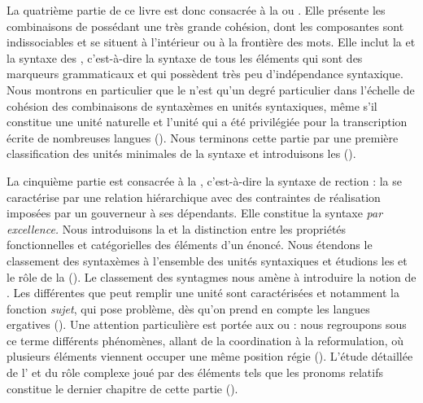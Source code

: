 La quatrième partie de ce livre est donc consacrée à la  ou . Elle présente les combinaisons de  possédant une très grande cohésion, dont les composantes sont indissociables et se situent à l’intérieur ou à la frontière des mots. Elle inclut la  et la syntaxe des , c’est-à-dire la syntaxe de tous les éléments qui sont des marqueurs grammaticaux et qui possèdent très peu d’indépendance syntaxique. Nous montrons en particulier que le  n’est qu’un degré particulier dans l’échelle de cohésion des combinaisons de syntaxèmes en unités syntaxiques, même s’il constitue une unité naturelle et l’unité qui a été privilégiée pour la transcription écrite de nombreuses langues (). Nous terminons cette partie par une première classification des unités minimales de la syntaxe et introduisons les   ().

La cinquième partie est consacrée à la , c’est-à-dire la syntaxe de rection : la  se caractérise par une relation hiérarchique avec des contraintes de réalisation imposées par un gouverneur à ses dépendants. Elle constitue la syntaxe \textit{par excellence.} Nous introduisons la  et la distinction entre les propriétés fonctionnelles et catégorielles des éléments d’un énoncé. Nous étendons le classement des syntaxèmes à l’ensemble des unités syntaxiques et étudions les  et le rôle de la  (). Le classement des syntagmes nous amène à introduire la notion de . Les différentes  que peut remplir une unité sont caractérisées et notamment la fonction \textit{sujet}, qui pose problème, dès qu’on prend en compte les langues ergatives (). Une attention particulière est portée aux  ou  : nous regroupons sous ce terme différents phénomènes, allant de la coordination à la reformulation, où plusieurs éléments viennent occuper une même position régie (). L’étude détaillée de l’ et du rôle complexe joué par des éléments tels que les pronoms relatifs constitue le dernier chapitre de cette partie ().

